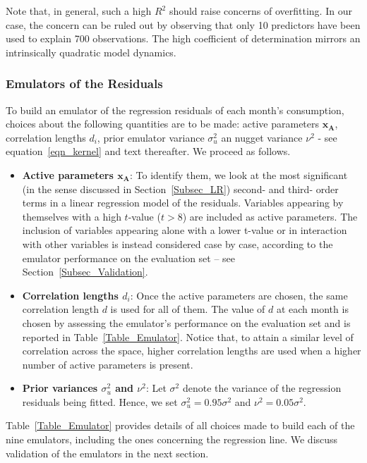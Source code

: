 \documentclass[preprint,12pt, sort&compress]{elsarticle}
\newcommand{\bd}[1]{\boldsymbol{#1}}
\newcommand{\x}[1][]{\bd{x_{#1}}}
\begin{document}
Note that, in general, such a high $R^2$ should raise concerns of overfitting. In our case, the concern can be ruled out by observing that only 10 predictors have been used to explain 700 observations. The high coefficient of determination mirrors an intrinsically quadratic model dynamics.


\subsubsection{Emulators of the Residuals}

To build an emulator of the regression residuals of each month’s consumption, choices about the following quantities are to be made: active parameters $\x[A]$, correlation lengths $d_i$, prior emulator variance $\sigma_u^2$ an nugget variance $\nu^2$ - see equation~\eqref{eqn_kernel} and text thereafter. We proceed as follows.
\begin{itemize}
\item {\bf Active parameters $\x[A]$}: To identify them, we look at the most significant (in the sense discussed in Section~\ref{Subsec_LR}) second- and third- order terms in a linear regression model of the residuals. Variables appearing by themselves with a high $t$-value ($t>8$) are included as active parameters. The inclusion of variables appearing alone with a lower t-value or in interaction with other variables is instead considered case by case, according to the emulator performance on the evaluation set – see Section~\ref{Subsec_Validation}.
\item {\bf Correlation lengths $d_i$}: Once the active parameters are chosen, the same correlation length $d$ is used for all of them. The value of $d$ at each month is chosen by assessing the emulator's performance on the evaluation set and is reported in Table~\ref{Table_Emulator}. Notice that, to attain a similar level of correlation across the space, higher correlation lengths are used when a higher number of active parameters is present.
\item {\bf Prior variances $\sigma_u^2$ and $\nu^2$}: Let $ \sigma^2$ denote the variance of the regression residuals being fitted. Hence, we set $\sigma_u^2 = 0.95 \sigma^2$ and $\nu^2 = 0.05 \sigma^2$.
\end{itemize}

Table~\ref{Table_Emulator} provides details of all choices made to build each of the nine emulators, including the ones concerning the regression line. We discuss validation of the emulators in the next section.
\end{document}

